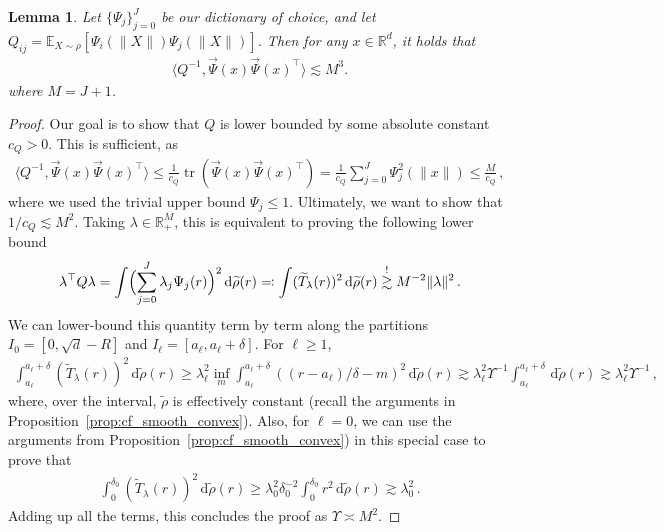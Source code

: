 \documentclass[10pt,a4paper]{amsart}
\newtheorem{lemma}{Lemma}
\newcommand*{\E}{\mathbb E}
\newcommand{\R}{\mathbb{R}}
\newcommand*{\dd}{\, \rd}
\newcommand*{\rd}{\mathrm{d}}
\renewcommand{\tilde}{\widetilde}
\DeclareMathOperator{\tr}{tr}
\begin{document}
\begin{lemma}\label{lem:sgd_lemma2}
Let $\{\Psi_j\}_{j=0}^J$ be our dictionary of choice, and let $Q_{ij} = \E_{X\sim\rho}[\Psi_i(\|X\|)\Psi_j(\|X\|)]$. Then for any $x \in \R^d$, it holds that
\begin{align*}
    \langle Q^{-1}, \vec\Psi(x)\vec\Psi(x)^\top\rangle \lesssim M^3.
\end{align*}
where $M = J+1$.
\end{lemma}

\begin{proof}
Our goal is to show that ${Q}$ is lower bounded by some absolute constant $c_Q > 0$. This is sufficient, as
\begin{align*}
    \langle Q^{-1}, \vec\Psi(x)\vec\Psi(x)^\top \rangle  {\le} \frac{1}{c_Q}\tr(\vec\Psi(x)\vec\Psi(x)^\top) = \frac{1}{c_Q}\sum_{j=0}^J\Psi_j^2(\|x\|) \leq \frac{M}{c_Q}\,,
\end{align*}
where we used the trivial upper bound $\Psi_j \leq 1$. Ultimately, we want to show that $1/c_Q \lesssim M^2$. Taking $\lambda \in \R^M_+$, this is equivalent to proving the following lower bound
\begin{align*}
    \lambda^\top Q \lambda = \int \Bigl(\sum_{j=0}^J \lambda_j\Psi_j(r)\Bigr)^2 \dd \tilde\rho(r) \eqqcolon \int (\tilde T_\lambda(r))^2 \dd \tilde\rho(r) \overset{!}{\gtrsim} M^{-2}\|\lambda\|^2\,.
\end{align*}
We can lower-bound this quantity term by term along the partitions $I_0 = [0,\sqrt{d}-R]$ and $I_\ell = [a_\ell,a_\ell + \delta]$. For $\ell \geq 1$,
\begin{align*}
    \int_{a_\ell}^{a_\ell + \delta} (\tilde T_\lambda(r))^2 \dd \tilde\rho(r) \geq \lambda_\ell^2 \inf_m \int_{a_\ell}^{a_\ell + \delta} ((r - a_\ell)/\delta - m)^2 \dd \tilde\rho(r) \gtrsim \lambda_\ell^2 \Upsilon^{-1}\int_{a_\ell}^{a_\ell + \delta}\dd\tilde\rho(r)\gtrsim \lambda_\ell^2 \Upsilon^{-1}\,,
\end{align*}
where, over the interval, $\tilde\rho$ is effectively constant (recall the arguments in Proposition~\ref{prop:cf_smooth_convex}). Also, for $\ell=0$, we can use the arguments from Proposition~\ref{prop:cf_smooth_convex}) in this special case to prove that
\begin{align*}
    \int_{0}^{\delta_0} (\tilde T_\lambda(r))^2 \dd \tilde\rho(r) \geq \lambda_0^2 \delta_0^{-2} \int_0^{\delta_0} r^2 \dd \tilde\rho(r) \gtrsim \lambda_0^2 \,.
\end{align*}
Adding up all the terms, this concludes the proof as $\Upsilon \asymp M^2$.
\end{proof}
\end{document}
